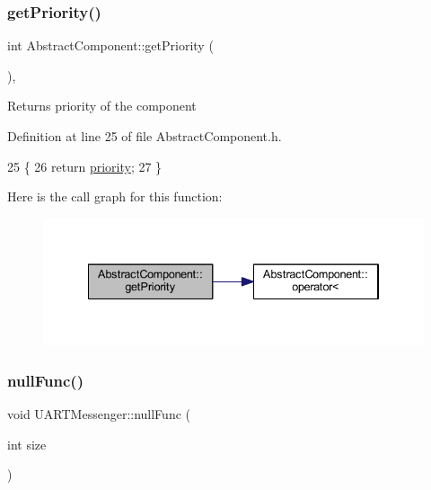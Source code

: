 \subsubsection{\texorpdfstring{get\+Priority()}{getPriority()}}
{\footnotesize\ttfamily int Abstract\+Component\+::get\+Priority (\begin{DoxyParamCaption}{ }\end{DoxyParamCaption})\hspace{0.3cm}{\ttfamily [inline]}, {\ttfamily [inherited]}}

\begin{DoxyReturn}{Returns}
priority of the component 
\end{DoxyReturn}


Definition at line 25 of file Abstract\+Component.\+h.


\begin{DoxyCode}
25                       \{
26         \textcolor{keywordflow}{return} \hyperlink{class_abstract_component_aff57dfa5f31be093a06b55560e33fb95}{priority};
27     \}
\end{DoxyCode}
Here is the call graph for this function\+:
\nopagebreak
\begin{figure}[H]
\begin{center}
\leavevmode
\includegraphics[width=334pt]{class_abstract_component_ac0b440d1d642ff1292ec3c544d75a8f1_cgraph}
\end{center}
\end{figure}
\mbox{\label{class_u_a_r_t_messenger_a91aa0a571db31d7a0a7f2535a97c30c3}} 
\subsubsection{\texorpdfstring{null\+Func()}{nullFunc()}}
{\footnotesize\ttfamily void U\+A\+R\+T\+Messenger\+::null\+Func (\begin{DoxyParamCaption}\item[{int}]{size }\end{DoxyParamCaption})\hspace{0.3cm}{\ttfamily [private]}}



